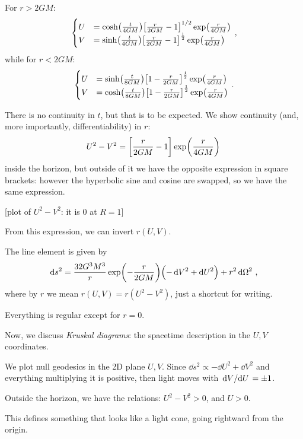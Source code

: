 \documentclass[main.tex]{subfiles}
\begin{document}
For \(r>2GM\):
%
\begin{align}
  \begin{cases}
      U &= \cosh(\frac{t}{4GM} ) \qty[\frac{r}{2GM} - 1]^{1/2} \exp(\frac{r}{4GM})  \\
      V &= \sinh(\frac{t}{4GM}) \qty[\frac{r}{2GM} - 1]^{\frac{1}{2}} \exp(\frac{r}{4GM})
  \end{cases}
\,,
\end{align}
%
while for \(r< 2GM\): 
%
\begin{align}
  \begin{cases}
      U &= \sinh(\frac{t}{8GM}) \qty[1 - \frac{r}{2GM}]^{\frac{1}{2}} \exp(\frac{r}{4GM}) \\
      V &= \cosh(\frac{t}{8GM}) \qty[1 - \frac{r}{2GM}]^{\frac{1}{2}} \exp(\frac{r}{4GM}) 
  \end{cases}
\,.
\end{align}

There is no continuity in \(t\), but that is to be expected. We show continuity (and, more importantly, differentiability) in \(r\): 
%
\begin{align}
  U^2 - V^2 = \qty[\frac{r}{2GM}- 1] \exp(\frac{r}{4GM})
\,
\end{align}
%
inside the horizon, but outside of it we have the opposite expression in square brackets: however the hyperbolic sine and cosine are swapped, so we have the same expression. 

[plot of \(U^2- V^2\): it is 0 at \(R = 1\)]

From this expression, we can invert \(r ( U, V)\). 

The line element is given by 
%
\begin{align}
  \dd{s^2} = \frac{32G^3M^3}{r} \exp(-\frac{r}{2GM})
  \qty(- \dd{V^2} + \dd{U^2}) + r^2 \dd{\Omega^2}
\,,
\end{align}
%
where by \(r\) we mean \(r(U,V) = r(U^2-V^2)\), just a shortcut for writing.

Everything is regular except for \(r=0\). 

Now, we discuss \emph{Kruskal diagrams}: the spacetime description in the \(U, V\) coordinates. 

We plot null geodesics in the 2D plane \(U, V\). 
Since \(\dd{s^2} \propto - \dd{U^2} + \dd{V^2}\) and everything multiplying it is positive, then light moves with \( \dv*{V}{U} = \pm 1\). 

Outside the horizon, we have the relations: \(U^2-V^2>0\), and \(U>0\). 

This defines something that looks like a light cone, going rightward from the origin. 
\end{document}
